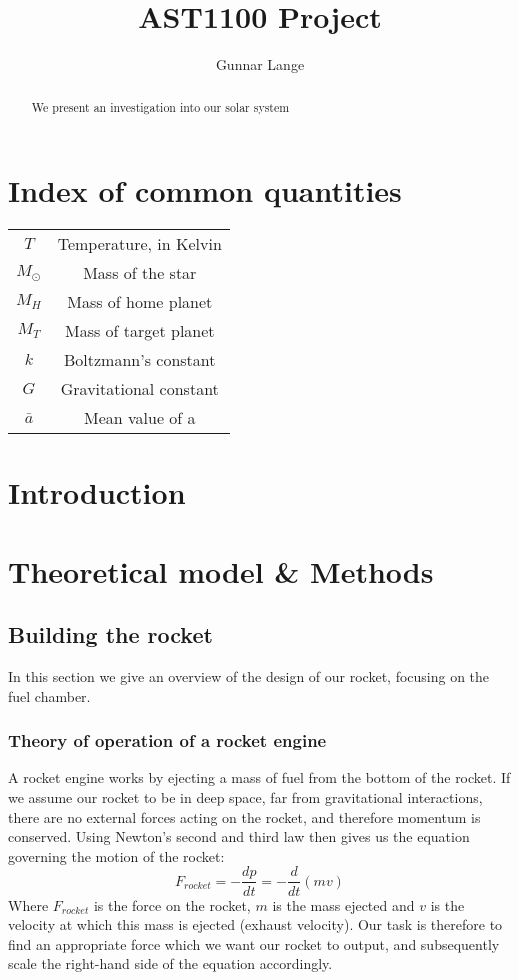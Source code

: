 \documentclass[a4paper,10pt,english]{article}
\title{AST1100 Project}
\author{Gunnar Lange}
\begin{document}
\maketitle
\begin{abstract}
We present an investigation into our solar system
\end{abstract}

\tableofcontents
\newpage
\section{Index of common quantities}
\begin{center}
\begin{tabular}{c c}
$T$ & Temperature, in Kelvin\\
$M_{\odot}$ & Mass of the star\\
$M_H$ & Mass of home planet\\
$M_T$ & Mass of target planet\\
$k$ & Boltzmann's constant\\
$G$ & Gravitational constant\\
$\bar{a}$ & Mean value of a
\end{tabular}
\end{center}
\newpage
\section{Introduction}
\section{Theoretical model \& Methods}
\subsection{Building the rocket}
In this section we give an overview of the design of our rocket, focusing on the fuel chamber.
\subsubsection{Theory of operation of a rocket engine}
A rocket engine works by ejecting a mass of fuel from the bottom of the rocket. If we assume our rocket to be in deep space, far from gravitational interactions, there are no external forces acting on the rocket, and therefore momentum is conserved. Using Newton's second and third law then gives us the equation governing the motion of the rocket:
\begin{equation}\label{eq:Force_on_rocket}
F_{rocket}=-\frac{dp}{dt}=-\frac{d}{dt}\left(mv\right)
\end{equation}
Where $F_{rocket}$ is the force on the rocket, $m$ is the mass ejected and $v$ is the velocity at which this mass is ejected (exhaust velocity). Our task is therefore to find an appropriate force which we want our rocket to output, and subsequently scale the right-hand side of the equation accordingly.
\end{document}
